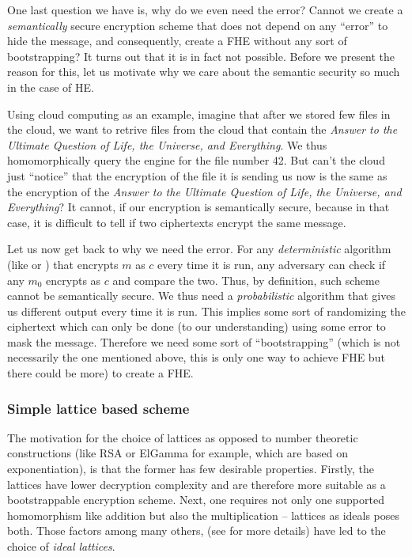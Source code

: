 One last question we have is, why do we even need the error? Cannot we create a \textit{semantically} secure encryption scheme that does not depend on any ``error'' to hide the message, and consequently, create a FHE without any sort of bootstrapping? It turns out that it is in fact not possible. Before we present the reason for this, let us motivate why we care about the semantic security so much in the case of HE.

\begin{example}
	Using cloud computing as an example, imagine that after we stored few files in the cloud, we want to retrive files from the cloud that contain the \textit{Answer to the Ultimate Question of Life, the Universe, and Everything}. We thus homomorphically query the engine for the file number 42. But can't the cloud just ``notice'' that the encryption of the file it is sending us now is the same as the encryption of the \textit{Answer to the Ultimate Question of Life, the Universe, and Everything}? It cannot, if our encryption is semantically secure, because in that case, it is difficult to tell if two ciphertexts encrypt the same message.
\end{example}

Let us now get back to why we need the error. For any \textit{deterministic} algorithm (like  or ) that encrypts $m$ as $c$ every time it is run, any adversary can check if any $m_0$ encrypts as $c$ and compare the two. Thus, by definition, such scheme cannot be semantically secure. We thus need a \textit{probabilistic} algorithm that gives us different output every time it is run. This implies some sort of randomizing the ciphertext which can only be done (to our understanding) using some error to mask the message. Therefore we need some sort of ``bootstrapping'' (which is not necessarily the one mentioned above, this is only one way to achieve FHE but there could be more) to create a FHE.

\iffalse
\subsubsection{Simple lattice based scheme}
The motivation for the choice of lattices as opposed to number theoretic constructions (like RSA or ElGamma for example, which are based on exponentiation), is that the former has few desirable properties. Firstly, the lattices have lower decryption complexity and are therefore more suitable as a bootstrappable encryption scheme. Next, one requires not only one supported homomorphism like addition but also the multiplication -- lattices as ideals poses both. Those factors among many others, (see \cite{gentry} for more details) have led to the choice of \textit{ideal lattices}.

